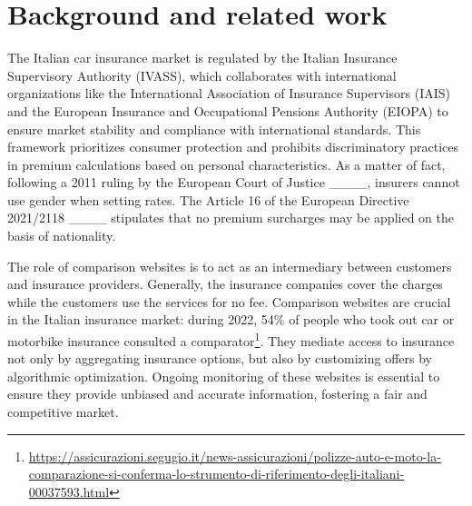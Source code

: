 \section{Background and related work}
\label{sec:rel-work}
The Italian car insurance market is regulated by the Italian Insurance Supervisory Authority (IVASS), which collaborates with international organizations like the International Association of Insurance Supervisors (IAIS) and the European Insurance and Occupational Pensions Authority (EIOPA) to ensure market stability and compliance with international standards. This framework prioritizes consumer protection and prohibits discriminatory practices in premium calculations based on personal characteristics. 
As a matter of fact, following a 2011 ruling by the European Court of Justice ____, insurers cannot use gender when setting rates. The Article 16 of the European Directive 2021/2118 ____ stipulates that no premium surcharges may be applied on the basis of nationality.

The role of comparison websites is to act as an intermediary between customers and insurance providers. Generally, the insurance companies cover the charges while the customers use the services for no fee. Comparison websites are crucial in the Italian insurance market: during 2022, 54\% of people who took out car or motorbike insurance consulted a comparator\footnote{\href{https://assicurazioni.segugio.it/news-assicurazioni/polizze-auto-e-moto-la-comparazione-si-conferma-lo-strumento-di-riferimento-degli-italiani-00037593.html}{https://assicurazioni.segugio.it/news-assicurazioni/polizze-auto-e-moto-la-comparazione-si-conferma-lo-strumento-di-riferimento-degli-italiani-00037593.html}}. They mediate access to insurance not only by aggregating insurance options, but also by customizing offers by algorithmic optimization. Ongoing monitoring of these websites is essential to ensure they provide unbiased and accurate information, fostering a fair and competitive market.

